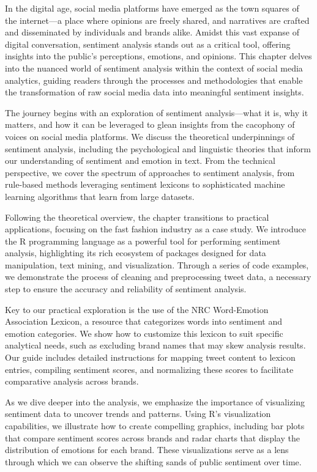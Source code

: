 \documentclass[
]{book}
\begin{document}
In the digital age, social media platforms have emerged as the town squares of the internet---a place where opinions are freely shared, and narratives are crafted and disseminated by individuals and brands alike. Amidst this vast expanse of digital conversation, sentiment analysis stands out as a critical tool, offering insights into the public's perceptions, emotions, and opinions. This chapter delves into the nuanced world of sentiment analysis within the context of social media analytics, guiding readers through the processes and methodologies that enable the transformation of raw social media data into meaningful sentiment insights.

The journey begins with an exploration of sentiment analysis---what it is, why it matters, and how it can be leveraged to glean insights from the cacophony of voices on social media platforms. We discuss the theoretical underpinnings of sentiment analysis, including the psychological and linguistic theories that inform our understanding of sentiment and emotion in text. From the technical perspective, we cover the spectrum of approaches to sentiment analysis, from rule-based methods leveraging sentiment lexicons to sophisticated machine learning algorithms that learn from large datasets.

Following the theoretical overview, the chapter transitions to practical applications, focusing on the fast fashion industry as a case study. We introduce the R programming language as a powerful tool for performing sentiment analysis, highlighting its rich ecosystem of packages designed for data manipulation, text mining, and visualization. Through a series of code examples, we demonstrate the process of cleaning and preprocessing tweet data, a necessary step to ensure the accuracy and reliability of sentiment analysis.

Key to our practical exploration is the use of the NRC Word-Emotion Association Lexicon, a resource that categorizes words into sentiment and emotion categories. We show how to customize this lexicon to suit specific analytical needs, such as excluding brand names that may skew analysis results. Our guide includes detailed instructions for mapping tweet content to lexicon entries, compiling sentiment scores, and normalizing these scores to facilitate comparative analysis across brands.

As we dive deeper into the analysis, we emphasize the importance of visualizing sentiment data to uncover trends and patterns. Using R's visualization capabilities, we illustrate how to create compelling graphics, including bar plots that compare sentiment scores across brands and radar charts that display the distribution of emotions for each brand. These visualizations serve as a lens through which we can observe the shifting sands of public sentiment over time.
\end{document}

